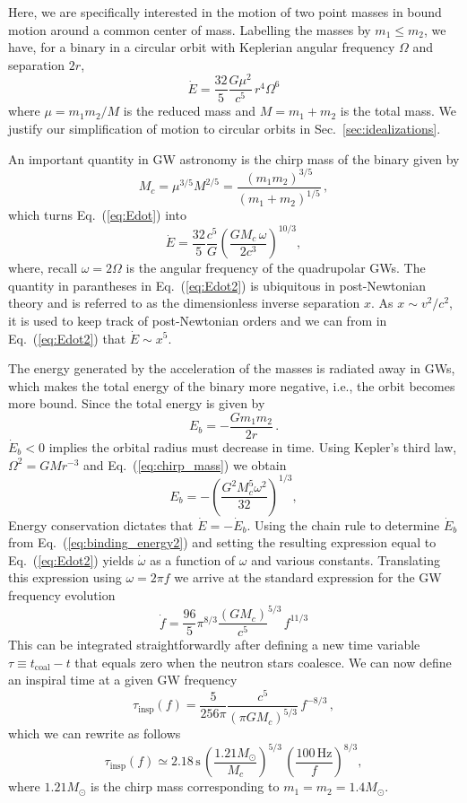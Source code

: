 \documentclass[amsmath,amssymb,aps,floats,amsfonts,notitlepage,superscriptaddress,eqsecnum,nofootinbib,10pt]{revtex4-1}
\newcommand{\f}{\frac}
\newcommand{\be}{\begin{equation}}
\newcommand{\ee}{\end{equation}}
\begin{document}
Here, we are specifically interested in the motion of two point masses in bound motion around a common center of mass.
Labelling the masses by $m_1 \le m_2$, we have, for a binary in a circular orbit with Keplerian angular frequency $\Omega$ and separation $2r$,
%
\be
\dot{E} = \f{32}{5}\f{G\mu^2}{c^5}\, r^4 \Omega^6\label{eq:Edot}
\ee
%
where $\mu= m_1 m_2/M$ is the reduced mass and $M=m_1+m_2$ is the total mass. 
We justify our simplification of motion to circular orbits in Sec.~\ref{sec:idealizations}.

An important quantity in GW astronomy is the chirp mass of the binary given by
%
\be
M_c = \mu^{3/5} M^{2/5} = \f{(m_1 m_2)^{3/5}}{(m_1+m_2)^{1/5}} \label{eq:chirp_mass}\, ,
\ee
%
which turns Eq.~(\ref{eq:Edot}) into
%
\be
\dot{E} = \f{32}{5}\f{c^5}{G} \left(\f{G M_c\, \omega}{2c^3}\right)^{10/3}, \label{eq:Edot2}
\ee
%
where, recall $\omega=2\Omega$ is the angular frequency of the quadrupolar GWs. 
The quantity in parantheses in Eq.~(\ref{eq:Edot2}) is ubiquitous in post-Newtonian theory and is
referred to as the dimensionless inverse separation $x$.
As $x\sim v^2/c^2$, it is used to keep track of post-Newtonian orders and we can from in Eq.~(\ref{eq:Edot2}) that $\dot{E}\sim x^5$. 

The energy generated by the acceleration of the masses is radiated away in GWs,
which makes the total energy of the binary more negative, i.e., the orbit becomes more bound. 
Since the total energy is given by
%
\be
E_b = -\frac{G m_1 m_2}{2r}\, . \label{eq:binding_energy1}
\ee
%
$\dot{E}_b < 0$ implies the orbital radius must decrease in time. 
Using Kepler's third law, $ \Omega^2 = G M r^{-3}$ and Eq.~(\ref{eq:chirp_mass}) we obtain
%
\be
E_b = -\left(\f{G^2 M_c^5 \omega^2}{32}\right)^{1/3}, \label{eq:binding_energy2}
\ee
%
Energy conservation dictates that $\dot{E}=-\dot{E}_b$. Using the chain rule to determine $\dot{E}_b$ from Eq.~(\ref{eq:binding_energy2})
and setting the resulting expression equal to Eq.~(\ref{eq:Edot2}) yields $\dot{\omega}$ as a function of $\omega$ and various constants.
Translating this expression using $\omega=2\pi f$ we arrive at the standard expression for the GW frequency evolution
%
\be
\dot{f} = \f{96}{5}\pi^{8/3} \f{(G M_c)}{c^5}^{5/3}\, f^{11/3} \label{eq:fdot}
\ee
%
This can be integrated straightforwardly after defining a new time variable $\tau\equiv t_\text{coal}-t$ that equals zero when the neutron stars coalesce.
We can now define an inspiral time at a given GW frequency
%
\be
\tau_\text{insp}(f) = \f{5}{256\pi}\f{c^5}{(\pi G M_c)^{5/3}} \,f^{-8/3}\label{eq:tau_insp}\, ,
\ee
%
%
%
which we can rewrite as follows
%
\be
\tau_\text{insp}(f) \simeq 2.18\,\text{s} \, \left(\f{1.21 M_\odot}{M_c}\right)^{5/3}\,\left(\f{100\,\text{Hz}}{f}\right)^{8/3}, \label{eq:tau_insp2}
\ee
%
where $1.21 M_\odot$ is the chirp mass corresponding to $m_1=m_2=1.4 M_\odot$.
\end{document}
